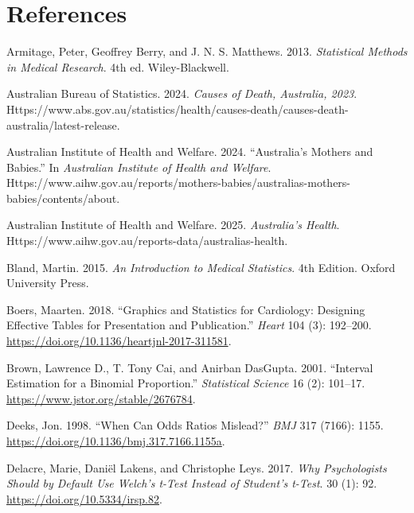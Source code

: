 \documentclass[
  a4paper,
]{memoir}
\newlength{\cslhangindent}
\newenvironment{CSLReferences}[2] %
 {\begin{list}{}{%
  \setlength{\itemindent}{0pt}
  \setlength{\leftmargin}{0pt}
  \setlength{\parsep}{0pt}
  \ifodd #1
   \setlength{\leftmargin}{\cslhangindent}
   \setlength{\itemindent}{-1\cslhangindent}
  \fi
  \setlength{\itemsep}{#2\baselineskip}}}
 {\end{list}}
\begin{document}
\chapter*{References}\label{references}


\protect{}\label{refs}
\begin{CSLReferences}{1}{1}
Armitage, Peter, Geoffrey Berry, and J. N. S. Matthews. 2013.
\emph{Statistical {Methods} in {Medical Research}}. 4th ed.
Wiley-Blackwell.

Australian Bureau of Statistics. 2024. \emph{Causes of {Death},
{Australia}, 2023}.
Https://www.abs.gov.au/statistics/health/causes-death/causes-death-australia/latest-release.

Australian Institute of Health and Welfare. 2024. {``Australia's Mothers
and Babies.''} In \emph{Australian Institute of Health and Welfare}.
Https://www.aihw.gov.au/reports/mothers-babies/australias-mothers-babies/contents/about.

Australian Institute of Health and Welfare. 2025. \emph{Australia's
Health}. Https://www.aihw.gov.au/reports-data/australias-health.

Bland, Martin. 2015. \emph{An {Introduction} to {Medical Statistics}}.
4th Edition. Oxford University Press.

Boers, Maarten. 2018. {``Graphics and Statistics for Cardiology:
Designing Effective Tables for Presentation and Publication.''}
\emph{Heart} 104 (3): 192--200.
\url{https://doi.org/10.1136/heartjnl-2017-311581}.

Brown, Lawrence D., T. Tony Cai, and Anirban DasGupta. 2001. {``Interval
{Estimation} for a {Binomial Proportion}.''} \emph{Statistical Science}
16 (2): 101--17. \url{https://www.jstor.org/stable/2676784}.

Deeks, Jon. 1998. {``When Can Odds Ratios Mislead?''} \emph{BMJ} 317
(7166): 1155. \url{https://doi.org/10.1136/bmj.317.7166.1155a}.

Delacre, Marie, Daniël Lakens, and Christophe Leys. 2017. \emph{Why
{Psychologists Should} by {Default Use Welch}'s t-Test {Instead} of
{Student}'s t-Test}. 30 (1): 92. \url{https://doi.org/10.5334/irsp.82}.


\end{CSLReferences}
\end{document}
